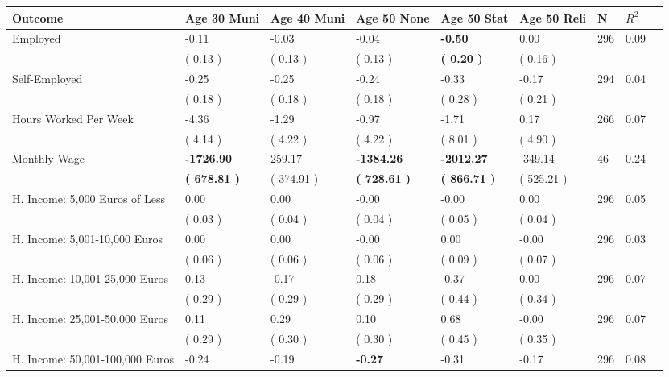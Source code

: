\begin{tabular}{L{6.2cm} C{1.8cm} C{1.8cm} C{1.8cm} C{1.8cm} C{1.8cm} C{1.8cm} C{0.3cm} C{0.3cm}}
\toprule
 \textbf{Outcome} & \textbf{Age 30 Muni} & \textbf{Age 40 Muni} & \textbf{Age 50 None} & \textbf{Age 50 Stat} & \textbf{Age 50 Reli} & \textbf{N} & \textbf{$ R^2$} \\
\midrule
Employed &     -0.11 &     -0.03 &     -0.04 & \textbf{    -0.50} &      0.00  & 296 &       0.09 \\ 
 & (     0.13 ) & (     0.13 ) & (     0.13 ) & \textbf{(     0.20 )} & (     0.16 )  & \\
Self-Employed &     -0.25 &     -0.25 &     -0.24 &     -0.33 &     -0.17  & 294 &       0.04 \\ 
 & (     0.18 ) & (     0.18 ) & (     0.18 ) & (     0.28 ) & (     0.21 )  & \\
Hours Worked Per Week &     -4.36 &     -1.29 &     -0.97 &     -1.71 &      0.17  & 266 &       0.07 \\ 
 & (     4.14 ) & (     4.22 ) & (     4.22 ) & (     8.01 ) & (     4.90 )  & \\
Monthly Wage & \textbf{ -1726.90} &    259.17 & \textbf{ -1384.26} & \textbf{ -2012.27} &   -349.14  & 46 &       0.24 \\ 
 & \textbf{(   678.81 )} & (   374.91 ) & \textbf{(   728.61 )} & \textbf{(   866.71 )} & (   525.21 )  & \\
H. Income: 5,000 Euros of Less &      0.00 &      0.00 &     -0.00 &     -0.00 &      0.00  & 296 &       0.05 \\ 
 & (     0.03 ) & (     0.04 ) & (     0.04 ) & (     0.05 ) & (     0.04 )  & \\
H. Income: 5,001-10,000 Euros &      0.00 &      0.00 &     -0.00 &      0.00 &     -0.00  & 296 &       0.03 \\ 
 & (     0.06 ) & (     0.06 ) & (     0.06 ) & (     0.09 ) & (     0.07 )  & \\
H. Income: 10,001-25,000 Euros &      0.13 &     -0.17 &      0.18 &     -0.37 &      0.00  & 296 &       0.07 \\ 
 & (     0.29 ) & (     0.29 ) & (     0.29 ) & (     0.44 ) & (     0.34 )  & \\
H. Income: 25,001-50,000 Euros &      0.11 &      0.29 &      0.10 &      0.68 &     -0.00  & 296 &       0.07 \\ 
 & (     0.29 ) & (     0.30 ) & (     0.30 ) & (     0.45 ) & (     0.35 )  & \\
H. Income: 50,001-100,000 Euros &     -0.24 &     -0.19 & \textbf{    -0.27} &     -0.31 &     -0.17  & 296 &       0.08 \\ 

\end{tabular}
